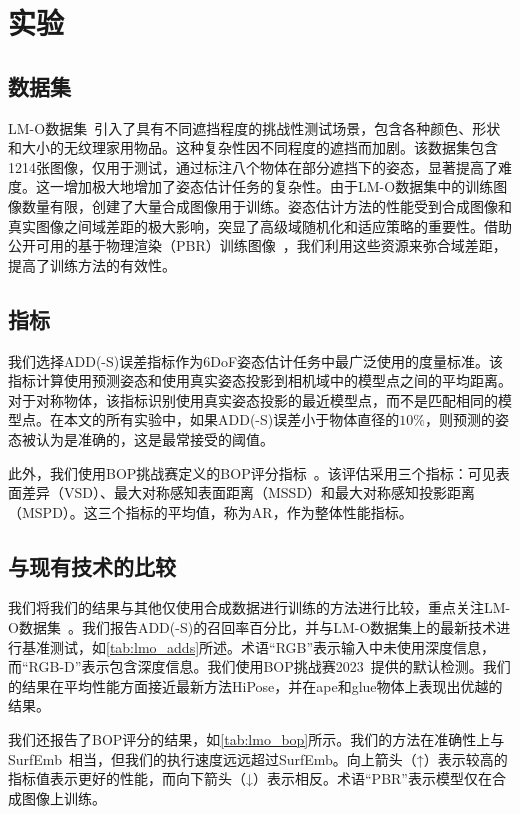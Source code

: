 \section{实验}

\subsection{数据集}
LM-O数据集~\cite{brachmann2016lmo}引入了具有不同遮挡程度的挑战性测试场景，包含各种颜色、形状和大小的无纹理家用物品。这种复杂性因不同程度的遮挡而加剧。该数据集包含1214张图像，仅用于测试，通过标注八个物体在部分遮挡下的姿态，显著提高了难度。这一增加极大地增加了姿态估计任务的复杂性。由于LM-O数据集中的训练图像数量有限，创建了大量合成图像用于训练。姿态估计方法的性能受到合成图像和真实图像之间域差距的极大影响，突显了高级域随机化和适应策略的重要性。借助公开可用的基于物理渲染（PBR）训练图像~\cite{hodan2024bop}，我们利用这些资源来弥合域差距，提高了训练方法的有效性。

\subsection{指标}
我们选择ADD(-S)误差指标作为6DoF姿态估计任务中最广泛使用的度量标准。该指标计算使用预测姿态和使用真实姿态投影到相机域中的模型点之间的平均距离。对于对称物体，该指标识别使用真实姿态投影的最近模型点，而不是匹配相同的模型点。在本文的所有实验中，如果ADD(-S)误差小于物体直径的$10\%$，则预测的姿态被认为是准确的，这是最常接受的阈值。

此外，我们使用BOP挑战赛定义的BOP评分指标~\cite{hodan2024bop}。该评估采用三个指标：可见表面差异（VSD）、最大对称感知表面距离（MSSD）和最大对称感知投影距离（MSPD）。这三个指标的平均值，称为AR，作为整体性能指标。

\subsection{与现有技术的比较}

我们将我们的结果与其他仅使用合成数据进行训练的方法进行比较，重点关注LM-O数据集~\cite{brachmann2016lmo}。我们报告ADD(-S)的召回率百分比，并与LM-O数据集上的最新技术进行基准测试，如\autoref{tab:lmo_adds}所述。术语“RGB”表示输入中未使用深度信息，而“RGB-D”表示包含深度信息。我们使用BOP挑战赛2023~\cite{hodan2024bop}提供的默认检测。我们的结果在平均性能方面接近最新方法HiPose，并在ape和glue物体上表现出优越的结果。

我们还报告了BOP评分的结果，如\autoref{tab:lmo_bop}所示。我们的方法在准确性上与SurfEmb~\cite{haugaard2022surfemb}相当，但我们的执行速度远远超过SurfEmb。向上箭头（↑）表示较高的指标值表示更好的性能，而向下箭头（↓）表示相反。术语“PBR”表示模型仅在合成图像上训练。

